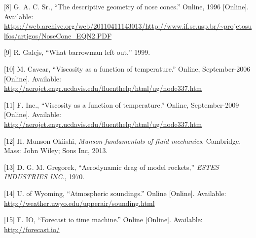 \documentclass[]{article}
\makeatletter
\newcommand\mainmatter{%
    \cleardoublepage
  \pagenumbering{arabic}}
\newcommand\backmatter{%
  \if@openright
    \cleardoublepage
  \else
    \clearpage
  \fi
   }
\makeatother
\begin{document}
{[}8{]} G. A. C. Sr., ``The descriptive geometry of nose cones.''
Online, 1996 {[}Online{]}. Available:
\url{https://web.archive.org/web/20110411143013/http://www.if.sc.usp.br/~projetosulfos/artigos/NoseCone_EQN2.PDF}

{[}9{]} R. Galejs, ``What barrowman left out,'' 1999.

{[}10{]} M. Cavcar, ``Viscosity as a function of temperature.'' Online,
September-2006 {[}Online{]}. Available:
\url{http://aerojet.engr.ucdavis.edu/fluenthelp/html/ug/node337.htm}

{[}11{]} F. Inc., ``Viscosity as a function of temperature.'' Online,
September-2009 {[}Online{]}. Available:
\url{http://aerojet.engr.ucdavis.edu/fluenthelp/html/ug/node337.htm}

{[}12{]} H. Munson Okiishi, \emph{Munson fundamentals of fluid
mechanics}. Cambridge, Mass: John Wiley; Sons Inc, 2013.

{[}13{]} D. G. M. Gregorek, ``Aerodynamic drag of model rockets,''
\emph{ESTES INDUSTRIES INC.}, 1970.

{[}14{]} U. of Wyoming, ``Atmospheric soundings.'' Online {[}Online{]}.
Available: \url{http://weather.uwyo.edu/upperair/sounding.html}

{[}15{]} F. IO, ``Forecast io time machine.'' Online {[}Online{]}.
Available: \url{http://forecast.io/}

%
%

\mainmatter
\end{document}
